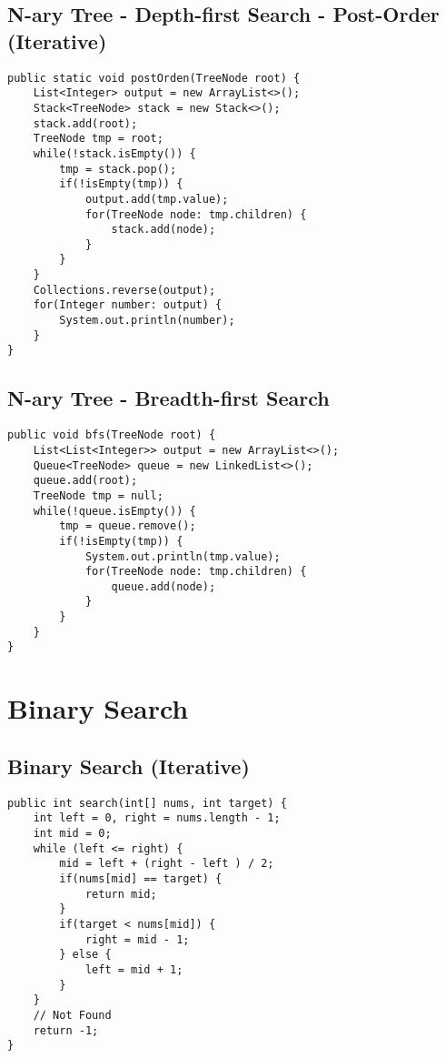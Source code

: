 \documentclass[10pt,letterpaper,twocolumn,twosided]{article}
\begin{document}
\subsection{N-ary Tree - Depth-first Search - Post-Order (Iterative)}
\begin{lstlisting}
public static void postOrden(TreeNode root) {
    List<Integer> output = new ArrayList<>();
    Stack<TreeNode> stack = new Stack<>();
    stack.add(root);
    TreeNode tmp = root;
    while(!stack.isEmpty()) {
        tmp = stack.pop();
        if(!isEmpty(tmp)) {
            output.add(tmp.value);
            for(TreeNode node: tmp.children) {
                stack.add(node);
            }
        }
    }
    Collections.reverse(output);
    for(Integer number: output) {
        System.out.println(number);
    }
}
\end{lstlisting}




\subsection{N-ary Tree - Breadth-first Search}
\begin{lstlisting}
public void bfs(TreeNode root) {
    List<List<Integer>> output = new ArrayList<>();
    Queue<TreeNode> queue = new LinkedList<>();
    queue.add(root);
    TreeNode tmp = null;
    while(!queue.isEmpty()) {
        tmp = queue.remove();
        if(!isEmpty(tmp)) {
            System.out.println(tmp.value);
            for(TreeNode node: tmp.children) {
                queue.add(node);
            }
        }
    }
}
\end{lstlisting}



                                  


\section{Binary Search}

\subsection{Binary Search (Iterative)}
\begin{lstlisting}
public int search(int[] nums, int target) {
    int left = 0, right = nums.length - 1;
    int mid = 0;
    while (left <= right) {
        mid = left + (right - left ) / 2;
        if(nums[mid] == target) {
            return mid;
        }
        if(target < nums[mid]) {
            right = mid - 1;
        } else {
            left = mid + 1;
        }
    }
    // Not Found
    return -1;
}
\end{lstlisting}
\end{document}
